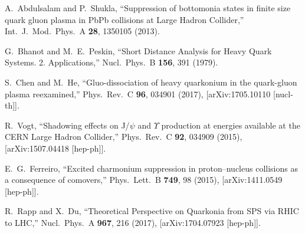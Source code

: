\documentclass[12pt,a4paper,final]{iopart} %
\begin{document}
\begin{thebibliography}{100}
  A.~Abdulsalam and P.~Shukla,
  ``Suppression of bottomonia states in finite size quark gluon plasma in PbPb collisions at Large Hadron Collider,''
  Int.\ J.\ Mod.\ Phys.\ A {\bf 28}, 1350105 (2013).

  
  G.~Bhanot and M.~E.~Peskin,
  ``Short Distance Analysis for Heavy Quark Systems. 2. Applications,''
  Nucl.\ Phys.\ B {\bf 156}, 391 (1979).

  S.~Chen and M.~He,
  ``Gluo-dissociation of heavy quarkonium in the quark-gluon plasma reexamined,''
  Phys.\ Rev.\ C {\bf 96}, 034901 (2017),
  [arXiv:1705.10110 [nucl-th]].

  







  R.~Vogt,
  ``Shadowing effects on J/$\psi$ and $\Upsilon$ production at energies available at the CERN Large Hadron Collider,''
  Phys.\ Rev.\ C {\bf 92}, 034909 (2015), [arXiv:1507.04418 [hep-ph]].


  E.~G.~Ferreiro,
  ``Excited charmonium suppression in proton–nucleus collisions as a consequence of comovers,''
  Phys.\ Lett.\ B {\bf 749}, 98 (2015), [arXiv:1411.0549 [hep-ph]].


  
  R.~Rapp and X.~Du,
  ``Theoretical Perspective on Quarkonia from SPS via RHIC to LHC,''
  Nucl.\ Phys.\ A {\bf 967}, 216 (2017), [arXiv:1704.07923 [hep-ph]].



\end{thebibliography}
\end{document}
